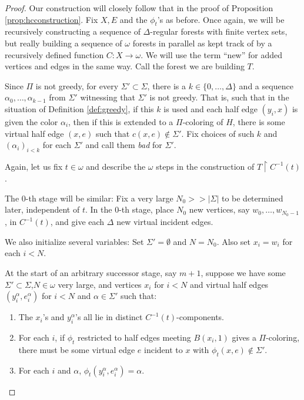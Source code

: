 \documentclass[11pt]{amsart}
\theoremstyle{definition}
\newcommand{\res}{\upharpoonright}
\newcommand{\inv}{^{-1}}
\begin{document}
\begin{proof}
    Our construction will closely follow that in the proof of Proposition \ref{prop:hcconstruction}. Fix $X,E$ and the $\phi_t$'s as before. Once again, we will be recursively constructing a sequence of $\Delta$-regular forests with finite vertex sets, but really building a sequence of $\omega$ forests in parallel as kept track of by a recursively defined function $C:X \rightarrow \omega$. We will use the term ``new'' for added vertices and edges in the same way. Call the forest we are building $T$.
    
    Since $\Pi$ is not greedy, for every $\Sigma' \subset \Sigma$, there is a $k \in \{0,\ldots,\Delta\}$ and a sequence $\alpha_0,\ldots,\alpha_{k-1}$ from $\Sigma'$ witnessing that $\Sigma'$ is not greedy. That is, such that in the situation of Definition \ref{def:greedy}, if this $k$ is used and each half edge $(y_i,x)$ is given the color $\alpha_i$, then if this is extended to a $\Pi$-coloring of $H$, there is some virtual half edge $(x,e)$ such that $c(x,e) \not\in \Sigma'$. Fix choices of such $k$ and $(\alpha_i)_{i < k}$ for each $\Sigma'$ and call them \textit{bad} for $\Sigma'$.
    
    Again, let us fix $t \in \omega$ and describe the $\omega$ steps in the construction of $T \res C\inv(t)$.
    
    The 0-th stage will be similar: Fix a very large $N_0 >> |\Sigma|$ to be determined later, independent of $t$. In the 0-th stage, place $N_0$ new vertices, say $w_0,\ldots,w_{N_0-1}$, in $C\inv(t)$, and give each $\Delta$ new virtual incident edges.
    
    We also initialize several variables: Set $\Sigma' = \emptyset$ and $N = N_0$. Also set $x_i = w_i$ for each $i < N$.
    
    At the start of an arbitrary successor stage, say $m+1$, suppose we have some $\Sigma' \subset \Sigma$,$N \in \omega$ very large, and vertices $x_i$ for $i < N$ and virtual half edges $(y_i^\alpha,e_i^\alpha)$ for $i < N$ and $\alpha \in \Sigma'$ such that:
    \begin{enumerate}
        \item The $x_i$'s and $y_i^\alpha$'s all lie in distinct $C\inv(t)$-components.
        \item For each $i$, if $\phi_t$ restricted to half edges meeting $B(x_i,1)$ gives a $\Pi$-coloring, there must be some virtual edge $e$ incident to $x$ with $\phi_t(x,e) \not\in \Sigma'$.
        \item For each $i$ and $\alpha$, $\phi_t(y_i^\alpha,e_i^\alpha) = \alpha$.
    \end{enumerate}
    

\end{proof}
\end{document}
